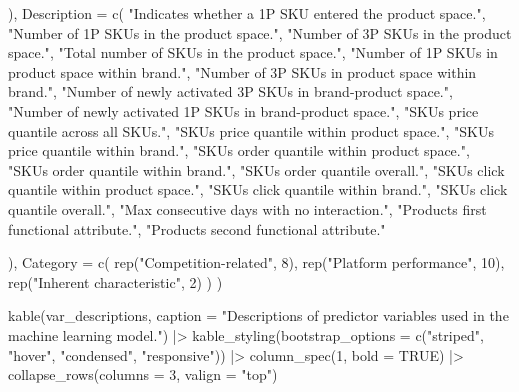 \documentclass[
  letterpaper,
  DIV=11,
  numbers=noendperiod]{scrartcl}
\newenvironment{Shaded}{\begin{snugshade}}{\end{snugshade}}
\newcommand{\AttributeTok}[1]{\textcolor[rgb]{0.40,0.45,0.13}{#1}}
\newcommand{\ConstantTok}[1]{\textcolor[rgb]{0.56,0.35,0.01}{#1}}
\newcommand{\DecValTok}[1]{\textcolor[rgb]{0.68,0.00,0.00}{#1}}
\newcommand{\FunctionTok}[1]{\textcolor[rgb]{0.28,0.35,0.67}{#1}}
\newcommand{\NormalTok}[1]{\textcolor[rgb]{0.00,0.23,0.31}{#1}}
\newcommand{\SpecialCharTok}[1]{\textcolor[rgb]{0.37,0.37,0.37}{#1}}
\newcommand{\StringTok}[1]{\textcolor[rgb]{0.13,0.47,0.30}{#1}}
\begin{document}
\begin{Shaded}
\begin{Highlighting}[]
\NormalTok{  ),}
  \AttributeTok{Description =} \FunctionTok{c}\NormalTok{(}
    \StringTok{"Indicates whether a 1P SKU entered the product space."}\NormalTok{,}
    \StringTok{"Number of 1P SKUs in the product space."}\NormalTok{,}
    \StringTok{"Number of 3P SKUs in the product space."}\NormalTok{,}
    \StringTok{"Total number of SKUs in the product space."}\NormalTok{,}
    \StringTok{"Number of 1P SKUs in product space within brand."}\NormalTok{,}
    \StringTok{"Number of 3P SKUs in product space within brand."}\NormalTok{,}
    \StringTok{"Number of newly activated 3P SKUs in brand{-}product space."}\NormalTok{,}
    \StringTok{"Number of newly activated 1P SKUs in brand{-}product space."}\NormalTok{,}
    \StringTok{"SKU\textquotesingle{}s price quantile across all SKUs."}\NormalTok{,}
    \StringTok{"SKU\textquotesingle{}s price quantile within product space."}\NormalTok{,}
    \StringTok{"SKU\textquotesingle{}s price quantile within brand."}\NormalTok{,}
    \StringTok{"SKU\textquotesingle{}s order quantile within product space."}\NormalTok{,}
    \StringTok{"SKU\textquotesingle{}s order quantile within brand."}\NormalTok{,}
    \StringTok{"SKU\textquotesingle{}s order quantile overall."}\NormalTok{,}
    \StringTok{"SKU\textquotesingle{}s click quantile within product space."}\NormalTok{,}
    \StringTok{"SKU\textquotesingle{}s click quantile within brand."}\NormalTok{,}
    \StringTok{"SKU\textquotesingle{}s click quantile overall."}\NormalTok{,}
    \StringTok{"Max consecutive days with no interaction."}\NormalTok{,}
    \StringTok{"Product\textquotesingle{}s first functional attribute."}\NormalTok{,}
    \StringTok{"Product\textquotesingle{}s second functional attribute."}
    
\NormalTok{  ),}
  \AttributeTok{Category =} \FunctionTok{c}\NormalTok{(}
    \FunctionTok{rep}\NormalTok{(}\StringTok{"Competition{-}related"}\NormalTok{, }\DecValTok{8}\NormalTok{),}
    \FunctionTok{rep}\NormalTok{(}\StringTok{"Platform performance"}\NormalTok{, }\DecValTok{10}\NormalTok{),}
    \FunctionTok{rep}\NormalTok{(}\StringTok{"Inherent characteristic"}\NormalTok{, }\DecValTok{2}\NormalTok{)}
\NormalTok{  )}
\NormalTok{)}

\FunctionTok{kable}\NormalTok{(var\_descriptions, }\AttributeTok{caption =} \StringTok{"Descriptions of predictor variables used in the machine learning model."}\NormalTok{) }\SpecialCharTok{|\textgreater{}}
  \FunctionTok{kable\_styling}\NormalTok{(}\AttributeTok{bootstrap\_options =} \FunctionTok{c}\NormalTok{(}\StringTok{"striped"}\NormalTok{, }\StringTok{"hover"}\NormalTok{, }\StringTok{"condensed"}\NormalTok{, }\StringTok{"responsive"}\NormalTok{)) }\SpecialCharTok{|\textgreater{}}
  \FunctionTok{column\_spec}\NormalTok{(}\DecValTok{1}\NormalTok{, }\AttributeTok{bold =} \ConstantTok{TRUE}\NormalTok{) }\SpecialCharTok{|\textgreater{}}
  \FunctionTok{collapse\_rows}\NormalTok{(}\AttributeTok{columns =} \DecValTok{3}\NormalTok{, }\AttributeTok{valign =} \StringTok{"top"}\NormalTok{)}
\end{Highlighting}
\end{Shaded}
\end{document}
